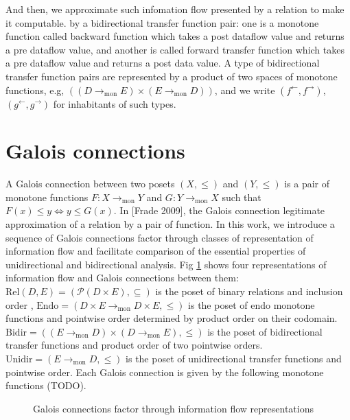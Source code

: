\documentclass{easychair}
\theoremstyle{definition}
\newcommand{\Pow}{\mathcal{P}}
\newcommand{\Rel}{\mathrm{Rel}}
\newcommand{\Endo}{\mathrm{Endo}}
\newcommand{\Bidir}{\mathrm{Bidir}}
\newcommand{\Unidir}{\mathrm{Unidir}}
\newcommand{\tomon}{\to_{\mathrm{mon}}}
\newcommand{\ff}{{f^{\rightarrow}}}
\newcommand{\fb}{{f^{\leftarrow}}}
\newcommand{\gf}{{g^{\rightarrow}}}
\newcommand{\gb}{{g^{\leftarrow}}}
\begin{document}
And then, we approximate such infomation flow presented by a relation to make it computable.
by a bidirectional transfer function pair: one is a monotone function
called backward function which takes a post dataflow value and returns a
pre dataflow value, and another is called forward transfer function
which takes a pre dataflow value and returns a post data value. A type
of bidirectional transfer function pairs are represented by a product of
two spaces of monotone functions, e.g, $((D \tomon E) \times (E \tomon D))$,
and we write $(\fb, \ff)$, $(\gb , \gf)$ for inhabitants of such types.

\section{Galois connections}
A Galois connection between two posets $(X , \leq)$ and $(Y , \leq)$ is a pair
of monotone functions $F : X \tomon Y$ and $G : Y \tomon X$ such that $F(x) \leq y \iff y \leq G(x)$.
In [Frade 2009], the Galois connection legitimate approximation of a
relation by a pair of function. In this work, we introduce a sequence of
Galois connections factor through classes of representation of
information flow and facilitate comparison of the essential properties
of unidirectional and bidirectional analysis. Fig \ref{fig:galois-connections} shows four representations of information
flow and Galois connections between them: $\Rel(D, E)= (\Pow(D \times E), \subseteq)$
is the poset of binary relations and inclusion order , $\Endo = (D \times E \tomon D \times E, \leq)$
is the poset of endo monotone functions and pointwise order determined
by product order on their codomain. $\Bidir = ((E \tomon D) \times (D \tomon E), \leq)$ is the poset of bidirectional transfer functions and product
order of two pointwise orders. $\Unidir = (E \tomon D , \leq)$ is the poset
of unidirectional transfer functions and pointwise order. Each Galois
connection is given by the following monotone functions (TODO).

\begin{figure}[h]
  \centering
  \label{fig:galois-connections}
  \caption{Galois connections factor through information flow representations}
\end{figure}
\end{document}
